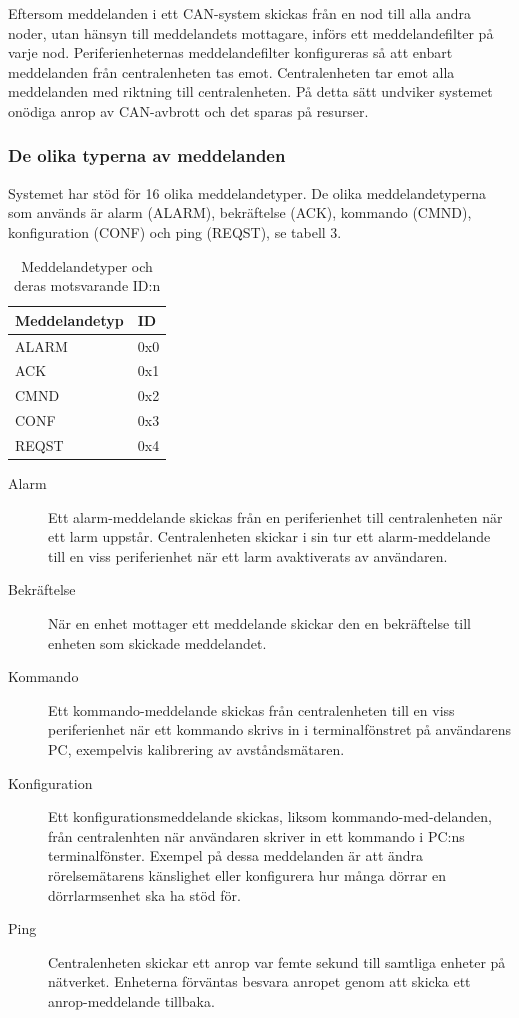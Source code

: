 Eftersom meddelanden i ett CAN-system skickas från en nod till alla andra noder, utan hänsyn till meddelandets mottagare, införs ett meddelandefilter på varje nod. Periferienheternas meddelandefilter konfigureras så att enbart meddelanden från centralenheten tas emot. Centralenheten tar emot alla meddelanden med riktning till centralenheten. På detta sätt undviker systemet onödiga anrop av CAN-avbrott och det sparas på resurser.

\subsubsection*{De olika typerna av meddelanden}

Systemet har stöd för 16 olika meddelandetyper. De olika meddelandetyperna som används är alarm (ALARM), bekräftelse (ACK), kommando (CMND), konfiguration (CONF) och ping (REQST), se tabell 3.

\begin{table}[h!]
\caption{Meddelandetyper och deras motsvarande ID:n}
\label{systemöversikt_can:2}
\centering
\begin{tabular}{|l|l| }
\hline
\textbf{Meddelandetyp} & \textbf{ID} \\
\hline
ALARM & 0x0 \\
\hline
ACK & 0x1 \\
\hline
CMND & 0x2\\
\hline
CONF & 0x3 \\
\hline
REQST & 0x4 \\
\hline
\end{tabular}
\end{table}

\begin{description}
    \item [Alarm] Ett alarm-meddelande skickas från en periferienhet till centralenheten när ett larm uppstår. Centralenheten skickar i sin tur ett alarm-meddelande till en viss periferienhet när ett larm avaktiverats av användaren.
    \item [Bekräftelse] När en enhet mottager ett meddelande skickar den en bekräftelse till enheten som skickade meddelandet.
    \item [Kommando] Ett kommando-meddelande skickas från centralenheten till en viss periferienhet när ett kommando skrivs in i terminalfönstret på användarens PC, exempelvis kalibrering av avståndsmätaren.
    \item [Konfiguration] Ett konfigurationsmeddelande skickas, liksom kommando-med-delanden, från centralenhten när användaren skriver in ett kommando i PC:ns terminalfönster. Exempel på dessa meddelanden är att ändra rörelsemätarens känslighet eller konfigurera hur många dörrar en dörrlarmsenhet ska ha stöd för.
    \item [Ping] Centralenheten skickar ett anrop var femte sekund till samtliga enheter på nätverket. Enheterna förväntas besvara anropet genom att skicka ett anrop-meddelande tillbaka.
\end{description}
	
